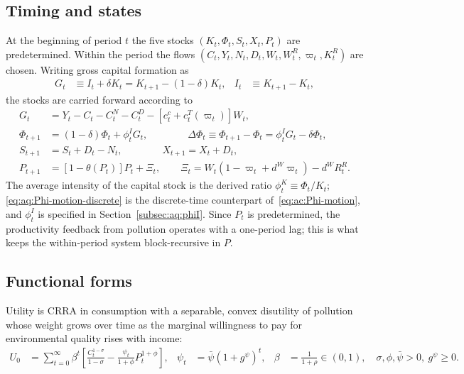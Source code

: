 \subsection{Timing and states}
\label{subsec:aq:timing}

At the beginning of period $t$ the five stocks $\left(K_t,\Phi_t,S_t,X_t,P_t\right)$ are predetermined. Within the period the flows $\left(C_t,Y_t,N_t,D_t,W_t,W^R_t,\varpi_t,K^R_t\right)$ are chosen. Writing gross capital formation as
\begin{align}
G_t &\equiv I_t+\delta K_t = K_{t+1}-\left(1-\delta\right)K_t,
&
I_t &\equiv K_{t+1}-K_t,
\label{eq:aq:gross-investment}
\end{align}
the stocks are carried forward according to
\begin{align}
G_t &= Y_t-C_t-C^N_t-C^D_t-\left[c^c_t+c^T_t(\varpi_t)\right]W_t,
\label{eq:aq:K-motion}
\\
\Phi_{t+1} &= (1-\delta)\Phi_t+\phi^I_tG_t,
\qquad\qquad
\Delta\Phi_t \equiv \Phi_{t+1}-\Phi_t = \phi^I_tG_t-\delta\Phi_t,
\label{eq:aq:Phi-motion-discrete}
\\
S_{t+1} &= S_t+D_t-N_t,
\qquad\qquad
X_{t+1} = X_t+D_t,
\label{eq:aq:SX-motion}
\\
P_{t+1} &= \left[1-\theta(P_t)\right]P_t+\Xi_t,
\qquad
\Xi_t = W_t\left(1-\varpi_t+d^W\varpi_t\right)-d^WR^R_t.
\label{eq:aq:P-motion}
\end{align}
The average intensity of the capital stock is the derived ratio $\phi^K_t\equiv\Phi_t/K_t$; \eqref{eq:aq:Phi-motion-discrete} is the discrete-time counterpart of~\eqref{eq:ac:Phi-motion}, and $\phi^I_t$ is specified in Section~\ref{subsec:aq:phiI}. Since $P_t$ is predetermined, the productivity feedback from pollution operates with a one-period lag; this is what keeps the within-period system block-recursive in $P$.

\subsection{Functional forms}
\label{subsec:aq:functional-forms}

 Utility is CRRA in consumption with a separable, convex disutility of pollution whose weight grows over time as the marginal willingness to pay for environmental quality rises with income:
\begin{align}
U_0 &= \sum_{t=0}^{\infty}\beta^t\left[\frac{C_t^{1-\sigma}}{1-\sigma}-\frac{\psi_t}{1+\phi}P_t^{1+\phi}\right],
&
\psi_t &= \bar\psi\left(1+g^\psi\right)^t,
&
\beta&=\frac{1}{1+\rho}\in(0,1),
\quad \sigma,\phi,\bar\psi>0,\ g^\psi\ge 0.
\label{eq:aq:utility}
\end{align}


